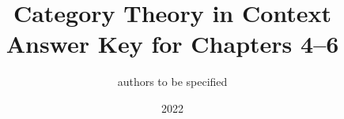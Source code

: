 \documentclass{report}
\begin{document}
\title{Category Theory in Context\\
Answer Key for Chapters 4--6}
\author{authors to be specified}
\date{2022}

\maketitle
\tableofcontents

\setcounter{chapter}{3}



\end{document}
